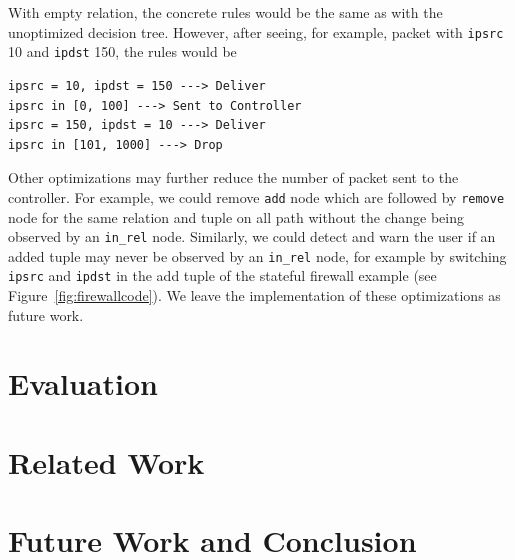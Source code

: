 \documentclass[preprint]{sigplanconf}
\begin{document}
With empty relation, the concrete rules would be the same as with the unoptimized decision tree. However, after seeing, for example, packet with \lstinline|ipsrc| 10 and \lstinline|ipdst| 150, the rules would be
\begin{lstlisting}
ipsrc = 10, ipdst = 150 ---> Deliver  
ipsrc in [0, 100] ---> Sent to Controller  
ipsrc = 150, ipdst = 10 ---> Deliver  
ipsrc in [101, 1000] ---> Drop  
\end{lstlisting}


Other optimizations may further reduce the number of packet sent to the controller. For example, we could remove \lstinline|add| node which are followed by \lstinline|remove| node for the same relation and tuple on all path without the change being observed by an \lstinline|in_rel| node. Similarly, we could detect and warn the user if an added tuple may never be observed by an \lstinline|in_rel| node, for example by switching \lstinline|ipsrc| and \lstinline|ipdst| in the add tuple of the stateful firewall example (see Figure~\ref{fig:firewallcode}). We leave the implementation of these optimizations as future work.


\section*{Evaluation}


\section*{Related Work}


\section*{Future Work and Conclusion}




\end{document}
